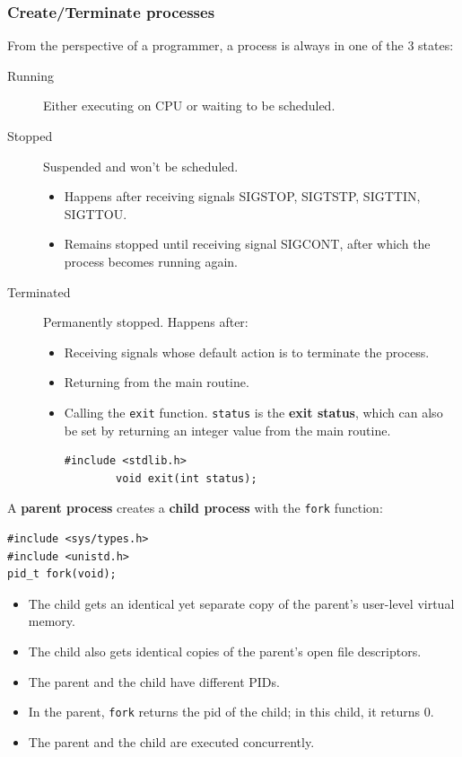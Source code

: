 \subsubsection{Create/Terminate processes}
From the perspective of a programmer, a process is always in one of the 3 states:
\begin{description}
	\item[Running]Either executing on CPU or waiting to be scheduled.
	\item[Stopped]Suspended and won't be scheduled. 
	\begin{itemize}
		\item Happens after receiving signals SIGSTOP, SIGTSTP, SIGTTIN, SIGTTOU.
		\item Remains stopped until receiving signal SIGCONT, after which the process becomes running again. 
	\end{itemize}
	\item[Terminated] Permanently stopped. Happens after:
	\begin{itemize}
		\item Receiving signals whose default action is to terminate the process.
		\item Returning from the main routine.
		\item Calling the \texttt{exit} function. \texttt{status} is the \textbf{exit status}, which can also be set by returning an integer value from the main routine.
		\begin{lstlisting}[frame=single]
		#include <stdlib.h>
		void exit(int status);
		\end{lstlisting}
	\end{itemize}
\end{description} 

A \textbf{parent process} creates a \textbf{child process} with the \texttt{fork} function:
\begin{lstlisting}[frame=single]
#include <sys/types.h>
#include <unistd.h>
pid_t fork(void);
\end{lstlisting}
\begin{itemize}
	\item The child gets an identical yet separate copy of the parent's user-level virtual memory.
	\item The child also gets identical copies of the parent's open file descriptors.
	\item The parent and the child have different PIDs.
	\item In the parent, \texttt{fork} returns the pid of the child; in this child, it returns 0. 
	\item The parent and the child are executed concurrently.
\end{itemize}
